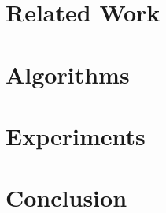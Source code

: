 \documentclass[]{sigcomm-alternate}
\begin{document}
\section{Related Work}\label{sec:related}

\section{Algorithms}\label{sec:algo}

\section{Experiments}\label{sec:exp}

\section{Conclusion}\label{sec:conclusion}







%

%
%


\balancecolumns
\end{document}
